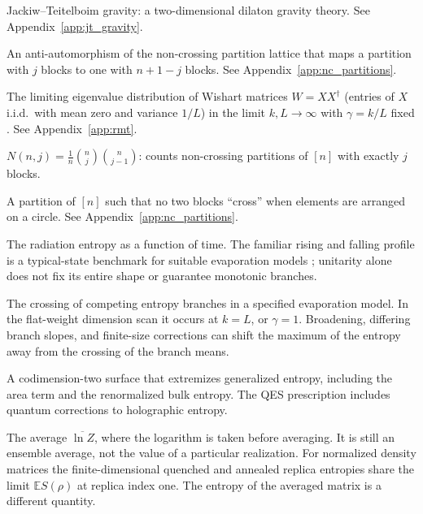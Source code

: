 \documentclass[11pt,letterpaper]{article}
\theoremstyle{plain}
\theoremstyle{definition}
\theoremstyle{remark}
\begin{document}
\begin{description}[style=nextline, leftmargin=2.5cm, labelwidth=2.3cm]
\item[JT gravity]
Jackiw--Teitelboim gravity: a two-dimensional dilaton gravity theory.
See Appendix~\ref{app:jt_gravity}.

\item[Kreweras complement]
An anti-automorphism of the non-crossing partition lattice that maps a
partition with $j$ blocks to one with $n+1-j$ blocks.
See Appendix~\ref{app:nc_partitions}.

\item[Marchenko--Pastur distribution]
The limiting eigenvalue distribution of Wishart matrices $W = XX^{\dagger}$
(entries of $X$ i.i.d.\ with mean zero and variance $1/L$)
in the limit $k, L \to \infty$ with $\gamma = k/L$ fixed
\cite{marchenkopastur1967}.  See Appendix~\ref{app:rmt}.

\item[Narayana number]
$N(n,j) = \frac{1}{n}\binom{n}{j}\binom{n}{j-1}$: counts non-crossing
partitions of $[n]$ with exactly $j$ blocks.

\item[Non-crossing partition]
A partition of $[n]$ such that no two blocks ``cross'' when elements are
arranged on a circle.  See Appendix~\ref{app:nc_partitions}.

\item[Page curve]
The radiation entropy as a function of time.  The familiar rising and falling
profile is a typical-state benchmark for suitable evaporation models
\cite{page1993,page1993information}; unitarity alone does not fix its entire
shape or guarantee monotonic branches.

\item[Page time]
The crossing of competing entropy branches in a specified evaporation model.
In the flat-weight dimension scan it occurs at $k=L$, or $\gamma=1$.
Broadening, differing branch slopes, and finite-size corrections can shift the
maximum of the entropy away from the crossing of the branch means.

\item[Quantum extremal surface]
A codimension-two surface that extremizes generalized entropy, including the
area term and the renormalized bulk entropy. The QES prescription
\cite{engelhardtwall2015} includes quantum corrections to holographic entropy.

\item[Quenched average]
The average $\overline{\ln Z}$, where the logarithm is taken before averaging.
It is still an ensemble average, not the value of a particular realization.
For normalized density matrices the finite-dimensional quenched and annealed
replica entropies share the limit $\mathbb E S(\rho)$ at replica index one.
The entropy of the averaged matrix is a different quantity.


\end{description}
\end{document}
